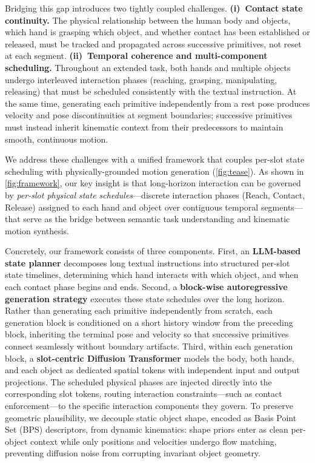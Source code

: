 \documentclass[sigconf, screen, review, anonymous]{acmart}
\begin{document}
Bridging this gap introduces two tightly coupled challenges.
\textbf{(i)~Contact state continuity.} The physical relationship between the human body and objects, which hand is grasping which object, and whether contact has been established or released, must be tracked and propagated across successive primitives, not reset at each segment.
\textbf{(ii)~Temporal coherence and multi-component scheduling.} Throughout an extended task, both hands and multiple objects undergo interleaved interaction phases (reaching, grasping, manipulating, releasing) that must be scheduled consistently with the textual instruction. At the same time, generating each primitive independently from a rest pose produces velocity and pose discontinuities at segment boundaries; successive primitives must instead inherit kinematic context from their predecessors to maintain smooth, continuous motion.

We address these challenges with a unified framework that couples per-slot state scheduling with physically-grounded motion generation (\cref{fig:tease}).
As shown in \cref{fig:framework}, our key insight is that long-horizon interaction can be governed by \emph{per-slot physical state schedules}---discrete interaction phases (Reach, Contact, Release) assigned to each hand and object over contiguous temporal segments---that serve as the bridge between semantic task understanding and kinematic motion synthesis.

Concretely, our framework consists of three components.
First, an \textbf{LLM-based state planner} decomposes long textual instructions into structured per-slot state timelines, determining which hand interacts with which object, and when each contact phase begins and ends.
Second, a \textbf{block-wise autoregressive generation strategy} executes these state schedules over the long horizon.
Rather than generating each primitive independently from scratch, each generation block is conditioned on a short history window from the preceding block, inheriting the terminal pose and velocity so that successive primitives connect seamlessly without boundary artifacts.
Third, within each generation block, a \textbf{slot-centric Diffusion Transformer} models the body, both hands, and each object as dedicated spatial tokens with independent input and output projections.
The scheduled physical phases are injected directly into the corresponding slot tokens, routing interaction constraints---such as contact enforcement---to the specific interaction components they govern.
To preserve geometric plausibility, we decouple static object shape, encoded as Basis Point Set (BPS) descriptors, from dynamic kinematics: shape priors enter as clean per-object context while only positions and velocities undergo flow matching, preventing diffusion noise from corrupting invariant object geometry.
\end{document}

